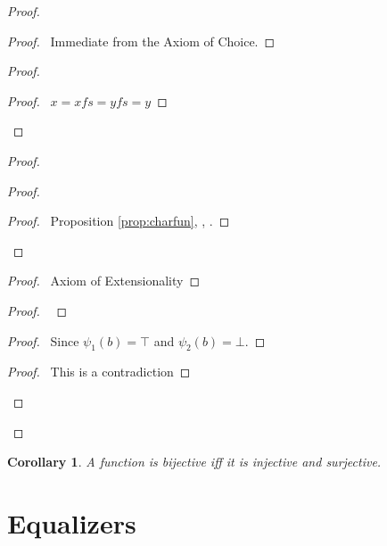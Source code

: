 \documentclass{book}
\let\qed\relax
\newtheorem{cor}{Corollary}[ax]
\theoremstyle{definition}
\begin{document}
\begin{proof}
\pf
{}
\begin{proof}
	\pf\ Immediate from the Axiom of Choice.
\end{proof}
\begin{proof}
	\begin{proof}
		\pf\ $x = xfs = yfs = y$
	\end{proof}
\end{proof}
\begin{proof}
	\begin{proof}
		\begin{proof}
			\pf\ Proposition \ref{prop:charfun}, , .
		\end{proof}
	\end{proof}
	\begin{proof}
		\pf\ Axiom of Extensionality
	\end{proof}
	\begin{proof}
		\pf\ 
	\end{proof}
	\begin{proof}
		\pf\ Since $\psi_1(b) = \top$ and $\psi_2(b) = \bot$.
	\end{proof}
	\qedstep
	\begin{proof}
		\pf\ This is a contradiction
	\end{proof}
\end{proof}
\qed
\end{proof}

\begin{cor}
A function is bijective iff it is injective and surjective.
\end{cor}

\section{Equalizers}
\end{document}
